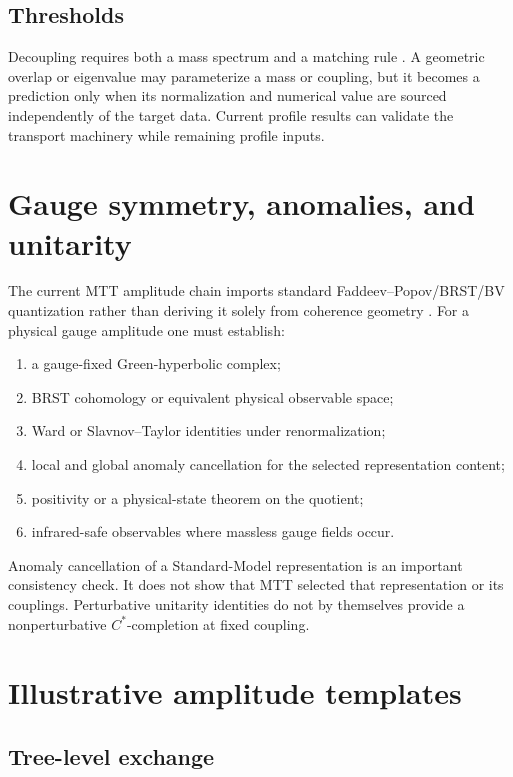 \documentclass[11pt,a4paper]{article}
\numberwithin{equation}{section}
\theoremstyle{definition}
\theoremstyle{remark}
\begin{document}
\subsection{Thresholds}

Decoupling requires both a mass spectrum and a matching rule
\cite{AppelquistCarazzone1975}.  A geometric overlap or eigenvalue may
parameterize a mass or coupling, but it becomes a prediction only when its
normalization and numerical value are sourced independently of the target
data.  Current profile results can validate the transport machinery while
remaining profile inputs.

\section{Gauge symmetry, anomalies, and unitarity}

The current MTT amplitude chain imports standard
Faddeev--Popov/BRST/BV quantization rather than deriving it solely from
coherence geometry \cite{FaddeevPopov1967,BecchiRouetStora1976,Tyutin1975}.
For a physical gauge amplitude one must establish:
\begin{enumerate}
\item a gauge-fixed Green-hyperbolic complex;
\item BRST cohomology or equivalent physical observable space;
\item Ward or Slavnov--Taylor identities under renormalization;
\item local and global anomaly cancellation for the selected
representation content;
\item positivity or a physical-state theorem on the quotient;
\item infrared-safe observables where massless gauge fields occur.
\end{enumerate}

Anomaly cancellation of a Standard-Model representation is an important
consistency check.  It does not show that MTT selected that representation
or its couplings.  Perturbative unitarity identities do not by themselves
provide a nonperturbative \(C^*\)-completion at fixed coupling.

\section{Illustrative amplitude templates}

\subsection{Tree-level exchange}
\end{document}
